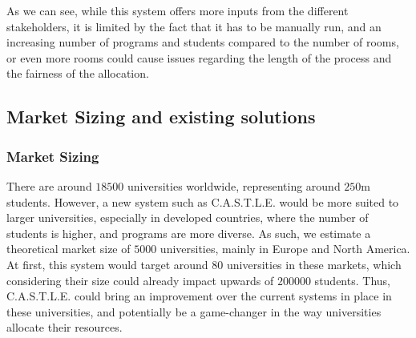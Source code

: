 \documentclass[a4paper, oneside]{article}
\theoremstyle{plain}
\newcommand{\castle}{C{\small.}A{\small.}S{\small.}T{\small.}L{\small.}E{\small.}}
\begin{document}
\linebreak

As we can see, while this system offers more inputs from the different stakeholders, it is limited by the fact that it has to be
manually run, and an increasing number of programs and students compared to the number of rooms, or even more rooms could cause issues
regarding the length of the process and the fairness of the allocation.

\subsection{Market Sizing and existing solutions}
\subsubsection{Market Sizing}
There are around $18500$ universities worldwide, representing around $250$m students. However, a new system such as \castle{} would be more suited to larger universities, especially in developed countries, where the number of students is higher, and programs are more diverse.
As such, we estimate a theoretical market size of $5000$ universities, mainly in Europe and North America.
At first, this system would target around 80 universities in these markets, which considering their size could already impact upwards of $200000$ students.
Thus, \castle{} could bring an improvement over the current systems in place in these universities, and potentially be a game-changer in the way universities allocate their resources.
\end{document}
